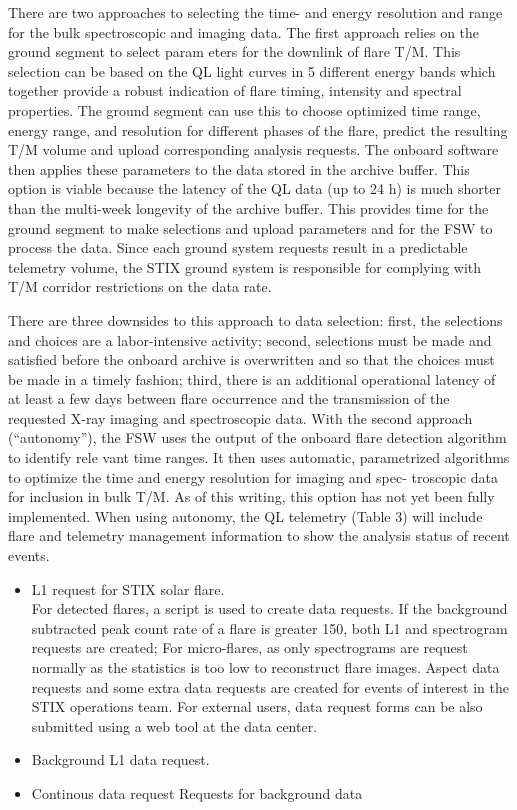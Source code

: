 \documentclass[referee]{aa} %
\begin{document}
There are two approaches to selecting the time- and energy
resolution and range for the bulk spectroscopic and imaging data.
The first approach relies on the ground segment to select param
eters for the downlink of flare T/M. This selection can be based
on the QL light curves in 5 different energy bands which together
provide a robust indication of flare timing, intensity and spectral
properties. The ground segment can use this to choose optimized
time range, energy range, and resolution for different phases of
the flare, predict the resulting T/M volume and upload corresponding analysis requests.
The onboard software then applies
these parameters to the data stored in the archive buffer. This
option is viable because the latency of the QL data (up to 24 h)
is much shorter than the multi-week longevity of the archive
buffer. This provides time for the ground segment to make selections 
and upload parameters and for the FSW to process the data.
Since each ground system requests result in a predictable telemetry volume, 
the STIX ground system is responsible for complying with T/M corridor restrictions on the data rate.

There are three downsides to this approach to data selection:
first, the selections and choices are a labor-intensive activity;
second, selections must be made and satisfied before the onboard
archive is overwritten and so that the choices must be made in a 
timely fashion; third, there is an additional operational latency of
at least a few days between flare occurrence and the transmission
of the requested X-ray imaging and spectroscopic data.
With the second approach (“autonomy”), the FSW uses the
output of the onboard flare detection algorithm to identify rele
vant time ranges. It then uses automatic, parametrized algorithms
to optimize the time and energy resolution for imaging and spec-
troscopic data for inclusion in bulk T/M. As of this writing, this
option has not yet been fully implemented. When using autonomy,
the QL telemetry (Table 3) will include flare and telemetry
management information to show the analysis status of recent
events.

\begin{itemize}
\item L1 request for STIX solar flare.\\
For detected flares,  a script is used to create data requests.
If the background subtracted peak count rate of a flare is greater 150,
both L1 and spectrogram requests are created;  For micro-flares, as only
spectrograms are request normally as the statistics is too
low to reconstruct flare images.  Aspect data requests
and some extra data requests are created for events of interest in the
STIX operations team.
For external users, data request forms can be also submitted using a web tool
at the data center.
\item Background L1 data request.
\item Continous data request Requests for background data
\end{itemize}
\end{document}

